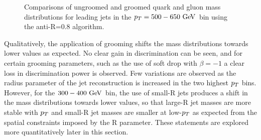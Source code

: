 \begin{figure}
\begin{center}
\caption{Comparisons of ungroomed and groomed quark and gluon mass distributions for leading jets in the 
$\pt=500-650 \GeV$ bin using the anti-\kT R=0.8 algorithm. }
\label{fig:qg_pt500_mass_AKt_R08}
\end{center}
\end{figure}
Qualitatively, the application of grooming shifts the mass distributions towards
lower values as expected. No clear gain in discrimination can be seen, and for
certain grooming parameters, such as the use of soft drop with $\beta=-1$ a clear
loss in discrimination power is observed. Few variations are observed as the 
radius parameter of the jet reconstruction is increased in the two highest $p_T$ bins. 
However, for the $300-400\GeV$ bin, the use of small-R jets produces a shift in the
mass distributions towards lower values, so that large-R jet masses are more stable
with $p_T$ and small-R jet masses are smaller at low-$p_T$ as expected from the spatial
constraints imposed by the R parameter. These statements are explored more 
quantitatively later in this section. 

